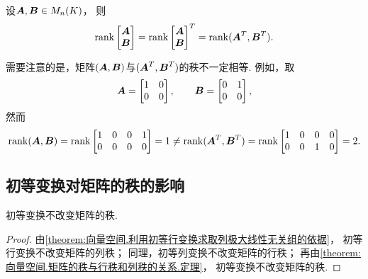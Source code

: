 \begin{example}
设\(\boldsymbol{A},\boldsymbol{B} \in M_n(K)\)，
则\begin{equation*}
	\rank\begin{bmatrix}
		\boldsymbol{A} \\ \boldsymbol{B}
	\end{bmatrix}
	= \rank\begin{bmatrix}
		\boldsymbol{A} \\ \boldsymbol{B}
	\end{bmatrix}^T
	= \rank(\boldsymbol{A}^T,\boldsymbol{B}^T).
\end{equation*}
\end{example}
\begin{remark}
需要注意的是，矩阵\((\boldsymbol{A},\boldsymbol{B})\)与\((\boldsymbol{A}^T,\boldsymbol{B}^T)\)的秩不一定相等.
例如，取\begin{equation*}
	\boldsymbol{A} = \begin{bmatrix}
		1 & 0 \\
		0 & 0
	\end{bmatrix},
	\qquad
	\boldsymbol{B} = \begin{bmatrix}
		0 & 1 \\
		0 & 0
	\end{bmatrix},
\end{equation*}
然而\begin{equation*}
	\rank(\boldsymbol{A},\boldsymbol{B})
	= \rank\begin{bmatrix}
		1 & 0 & 0 & 1 \\
		0 & 0 & 0 & 0
	\end{bmatrix}
	= 1
	\neq
	\rank(\boldsymbol{A}^T,\boldsymbol{B}^T)
	= \rank\begin{bmatrix}
		1 & 0 & 0 & 0 \\
		0 & 0 & 1 & 0
	\end{bmatrix}
	= 2.
\end{equation*}
\end{remark}

\subsection{初等变换对矩阵的秩的影响}
\begin{theorem}\label{theorem:线性方程组.初等变换不变秩}
初等变换不改变矩阵的秩.
\begin{proof}
由\cref{theorem:向量空间.利用初等行变换求取列极大线性无关组的依据}，
初等行变换不改变矩阵的列秩；
同理，初等列变换不改变矩阵的行秩；
再由\cref{theorem:向量空间.矩阵的秩与行秩和列秩的关系.定理}，
初等变换不改变矩阵的秩.
\end{proof}
\end{theorem}


